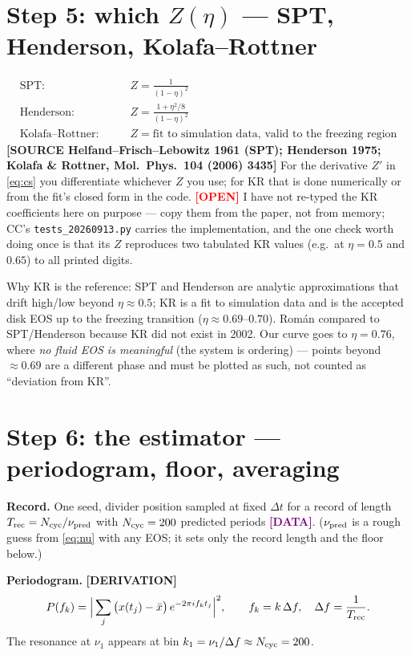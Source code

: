 \documentclass[11pt,a4paper]{article}
\newcommand{\src}[1]{\textcolor{OliveGreen}{\textbf{[SOURCE #1]}}}
\newcommand{\der}{\textcolor{NavyBlue}{\textbf{[DERIVATION]}}}
\newcommand{\dat}{\textcolor{Purple}{\textbf{[DATA]}}}
\newcommand{\opn}{\textcolor{Red}{\textbf{[OPEN]}}}
\begin{document}
\section{Step 5: which $Z(\eta)$ --- SPT, Henderson, Kolafa--Rottner}
\label{sec:eos}
\begin{align}
\text{SPT:}\qquad & Z = \frac{1}{(1-\eta)^2} \\
\text{Henderson:}\qquad & Z = \frac{1 + \eta^2/8}{(1-\eta)^2} \\
\text{Kolafa--Rottner:}\qquad & Z = \text{fit to simulation data, valid to the freezing region}
\end{align}
\src{Helfand--Frisch--Lebowitz 1961 (SPT); Henderson 1975; Kolafa \& Rottner, Mol.\ Phys.\ 104 (2006) 3435}
For the derivative $Z'$ in \eqref{eq:cs} you differentiate whichever $Z$ you use; for KR that is done numerically or from the fit's closed form in the code. \opn{} I have not re-typed the KR coefficients here on purpose --- copy them from the paper, not from memory; CC's \texttt{tests\_20260913.py} carries the implementation, and the one check worth doing once is that its $Z$ reproduces two tabulated KR values (e.g.\ at $\eta = 0.5$ and $0.65$) to all printed digits.

Why KR is the reference: SPT and Henderson are analytic approximations that drift high/low beyond $\eta \approx 0.5$; KR is a fit to simulation data and is the accepted disk EOS up to the freezing transition ($\eta \approx 0.69$--$0.70$). Rom\'an compared to SPT/Henderson because KR did not exist in 2002. Our curve goes to $\eta = 0.76$, where \emph{no fluid EOS is meaningful} (the system is ordering) --- points beyond $\approx 0.69$ are a different phase and must be plotted as such, not counted as ``deviation from KR''.

\section{Step 6: the estimator --- periodogram, floor, averaging}
\label{sec:est}
\textbf{Record.} One seed, divider position sampled at fixed $\Delta t$ for a record of length $T_{\rm rec} = N_{\rm cyc}/\nu_{\rm pred}$ with $N_{\rm cyc} = 200$ predicted periods \dat{}. ($\nu_{\rm pred}$ is a rough guess from \eqref{eq:nu} with any EOS; it sets only the record length and the floor below.)

\textbf{Periodogram.} \der{}
\begin{equation}
P(f_k) = \Big|\sum_j \big(x(t_j) - \bar x\big)\, e^{-2\pi i f_k t_j}\Big|^2,
\qquad f_k = k\,\Delta f,\quad \Delta f = \frac{1}{T_{\rm rec}} .
\end{equation}
The resonance at $\nu_1$ appears at bin $k_1 = \nu_1/\Delta f \approx N_{\rm cyc} = 200$.
\end{document}
